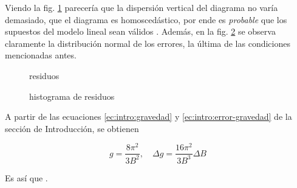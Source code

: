 Viendo la fig. \ref{fig:datos:residuos} parecería que la dispersión vertical
del diagrama no varía demasiado, que el diagrama es homoscedástico, por ende
es \textit{probable} que los supuestos del modelo lineal sean válidos
\cite[págs. 527-528]{estadistica}. Además, en la fig.
\ref{fig:datos:histograma} se observa claramente la distribución normal de 
los errores, la última de las condiciones mencionadas antes.


\begin{figure}[H]
    \centering
    
    \caption{residuos}
    \label{fig:datos:residuos}
\end{figure}

\begin{figure}[H]
    \centering
    
    \caption{histograma de residuos}
    \label{fig:datos:histograma}
\end{figure}

A partir de las ecuaciones \ref{ec:intro:gravedad} y
\ref{ec:intro:error-gravedad} de la sección de Introducción, se
obtienen

\[
    g = \frac{8\pi^2}{3B^2}, \quad \Delta g = \frac{16\pi^2}{3B^3} \Delta B
\]

Es así que .
